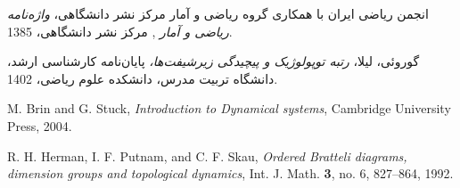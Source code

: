 %
%
%
%
\small

\begin{thebibliography}{99}

انجمن ریاضی ایران با همکاری گروه ریاضی و آمار مرکز نشر دانشگاهی، 
\emph{%
واژه‌نامه ریاضی و آمار%
},
مرکز نشر دانشگاهی، 1385.


گوروئی، لیلا، 
\emph{
رتبه توپولوژیک و پیچیدگی  زیرشیفت‌ها،
}
پایان‌نامه کارشناسی ارشد، دانشگاه تربیت مدرس، دانشکده علوم ریاضی، 1402.

\begin{LTRitems}
\resetlatinfont

M. Brin and G. Stuck, \emph{Introduction to Dynamical systems}, 
Cambridge University Press, 2004.

R. H. Herman, I. F. Putnam, and C. F. Skau, \emph{Ordered Bratteli diagrams, 
dimension groups and topological dynamics}, Int. J. Math. \textbf{3}, no. 6, 
827--864, 1992.

\end{LTRitems}


\end{thebibliography}